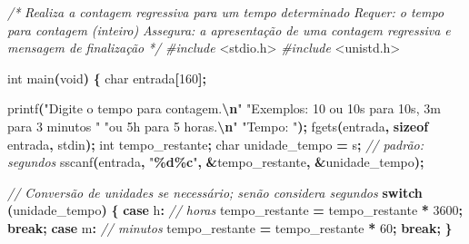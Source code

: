 \documentclass[
  11pt,
  a4paper,
]{scrbook}
\newenvironment{Shaded}{\begin{snugshade}}{\end{snugshade}}
\newcommand{\CharTok}[1]{\textcolor[rgb]{0.31,0.60,0.02}{#1}}
\newcommand{\CommentTok}[1]{\textcolor[rgb]{0.56,0.35,0.01}{\textit{#1}}}
\newcommand{\ControlFlowTok}[1]{\textcolor[rgb]{0.13,0.29,0.53}{\textbf{#1}}}
\newcommand{\DataTypeTok}[1]{\textcolor[rgb]{0.13,0.29,0.53}{#1}}
\newcommand{\DecValTok}[1]{\textcolor[rgb]{0.00,0.00,0.81}{#1}}
\newcommand{\ImportTok}[1]{#1}
\newcommand{\KeywordTok}[1]{\textcolor[rgb]{0.13,0.29,0.53}{\textbf{#1}}}
\newcommand{\NormalTok}[1]{#1}
\newcommand{\OperatorTok}[1]{\textcolor[rgb]{0.81,0.36,0.00}{\textbf{#1}}}
\newcommand{\PreprocessorTok}[1]{\textcolor[rgb]{0.56,0.35,0.01}{\textit{#1}}}
\newcommand{\SpecialCharTok}[1]{\textcolor[rgb]{0.81,0.36,0.00}{\textbf{#1}}}
\newcommand{\StringTok}[1]{\textcolor[rgb]{0.31,0.60,0.02}{#1}}
\begin{document}
\begin{Shaded}
\begin{Highlighting}[]
\CommentTok{/*}
\CommentTok{Realiza a contagem regressiva para um tempo determinado}
\CommentTok{Requer: o tempo para contagem (inteiro)}
\CommentTok{Assegura: a apresentação de uma contagem regressiva e mensagem de finalização}
\CommentTok{*/}
\PreprocessorTok{\#include }\ImportTok{\textless{}stdio.h\textgreater{}}
\PreprocessorTok{\#include }\ImportTok{\textless{}unistd.h\textgreater{}}

\DataTypeTok{int}\NormalTok{ main}\OperatorTok{(}\DataTypeTok{void}\OperatorTok{)} \OperatorTok{\{}
    \DataTypeTok{char}\NormalTok{ entrada}\OperatorTok{[}\DecValTok{160}\OperatorTok{];}

\NormalTok{    printf}\OperatorTok{(}\StringTok{"Digite o tempo para contagem.}\SpecialCharTok{\textbackslash{}n}\StringTok{"}
           \StringTok{"Exemplos: \textquotesingle{}10\textquotesingle{} ou \textquotesingle{}10s\textquotesingle{} para 10s, \textquotesingle{}3m\textquotesingle{} para 3 minutos "}
           \StringTok{"ou \textquotesingle{}5h\textquotesingle{} para 5 horas.}\SpecialCharTok{\textbackslash{}n}\StringTok{"}
           \StringTok{"Tempo: "}\OperatorTok{);}
\NormalTok{    fgets}\OperatorTok{(}\NormalTok{entrada}\OperatorTok{,} \KeywordTok{sizeof}\NormalTok{ entrada}\OperatorTok{,}\NormalTok{ stdin}\OperatorTok{);}
    \DataTypeTok{int}\NormalTok{ tempo\_restante}\OperatorTok{;}
    \DataTypeTok{char}\NormalTok{ unidade\_tempo }\OperatorTok{=} \CharTok{\textquotesingle{}s\textquotesingle{}}\OperatorTok{;}  \CommentTok{// padrão: segundos}
\NormalTok{    sscanf}\OperatorTok{(}\NormalTok{entrada}\OperatorTok{,} \StringTok{"}\SpecialCharTok{\%d\%c}\StringTok{"}\OperatorTok{,} \OperatorTok{\&}\NormalTok{tempo\_restante}\OperatorTok{,} \OperatorTok{\&}\NormalTok{unidade\_tempo}\OperatorTok{);}

    \CommentTok{// Conversão de unidades se necessário; senão considera segundos}
    \ControlFlowTok{switch} \OperatorTok{(}\NormalTok{unidade\_tempo}\OperatorTok{)} \OperatorTok{\{}
        \ControlFlowTok{case} \CharTok{\textquotesingle{}h\textquotesingle{}}\OperatorTok{:}  \CommentTok{// horas}
\NormalTok{            tempo\_restante }\OperatorTok{=}\NormalTok{ tempo\_restante }\OperatorTok{*} \DecValTok{3600}\OperatorTok{;}
            \ControlFlowTok{break}\OperatorTok{;}
        \ControlFlowTok{case} \CharTok{\textquotesingle{}m\textquotesingle{}}\OperatorTok{:}  \CommentTok{// minutos}
\NormalTok{            tempo\_restante }\OperatorTok{=}\NormalTok{ tempo\_restante }\OperatorTok{*} \DecValTok{60}\OperatorTok{;}
            \ControlFlowTok{break}\OperatorTok{;}
    \OperatorTok{\}}


\end{Highlighting}
\end{Shaded}
\end{document}
